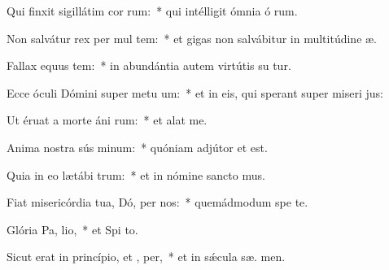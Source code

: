 \item Qui finxit sigillátim cor rum:~* qui intélligit ómnia ó rum.
\item Non salvátur rex per mul tem:~* et gigas non salvábitur in multitúdine  æ.
\item Fallax equus  tem:~* in abundántia autem virtútis su  tur.
\item Ecce óculi Dómini super metu um:~* et in eis, qui sperant super miseri jus:
\item Ut éruat a morte áni rum:~* et alat   me.
\item Anima nostra sús minum:~* quóniam adjútor et   est.
\item Quia in eo lætábi  trum:~* et in nómine sancto  mus.
\item Fiat misericórdia tua, Dó, per nos:~* quemádmodum spe  te.
\item Glória Pa,  lio,~* et Spi to.
\item Sicut erat in princípio, et ,  per,~* et in sǽcula sæ. men.
